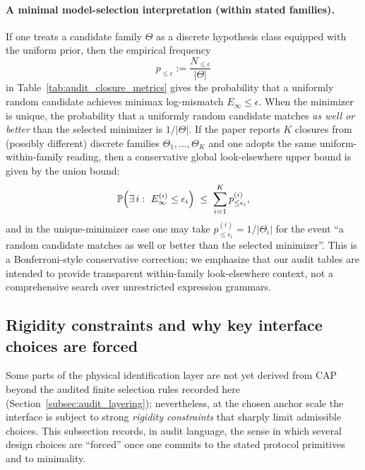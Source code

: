 \paragraph{A minimal model-selection interpretation (within stated families).}
If one treats a candidate family $\Theta$ as a discrete hypothesis class equipped with the uniform prior, then the empirical frequency
\[
p_{\le \epsilon}:=\frac{N_{\le \epsilon}}{|\Theta|}
\]
in Table~\ref{tab:audit_closure_metrics} gives the probability that a uniformly random candidate achieves minimax log-mismatch $E_\infty\le \epsilon$.
When the minimizer is unique, the probability that a uniformly random candidate matches \emph{as well or better} than the selected minimizer is $1/|\Theta|$.
If the paper reports $K$ closures from (possibly different) discrete families $\Theta_1,\dots,\Theta_K$ and one adopts the same uniform-within-family reading, then a conservative global look-elsewhere upper bound is given by the union bound:
\[
\mathbb{P}\Bigl(\exists\,i:\ E_{\infty}^{(i)}\le \epsilon_i\Bigr)
\;\le\;
\sum_{i=1}^{K} p^{(i)}_{\le \epsilon_i},
\]
and in the unique-minimizer case one may take $p^{(i)}_{\le \epsilon_i}=1/|\Theta_i|$ for the event ``a random candidate matches as well or better than the selected minimizer''.
This is a Bonferroni-style conservative correction; we emphasize that our audit tables are intended to provide transparent within-family look-elsewhere context, not a comprehensive search over unrestricted expression grammars.

\subsection{Rigidity constraints and why key interface choices are forced}
\label{subsec:rigidity_constraints_forced}

Some parts of the physical identification layer are not yet derived from CAP beyond the audited finite selection rules recorded here (Section~\ref{subsec:audit_layering}); nevertheless, at the chosen anchor scale the interface is subject to strong \emph{rigidity constraints} that sharply limit admissible choices.
This subsection records, in audit language, the sense in which several design choices are ``forced'' once one commits to the stated protocol primitives and to minimality.

